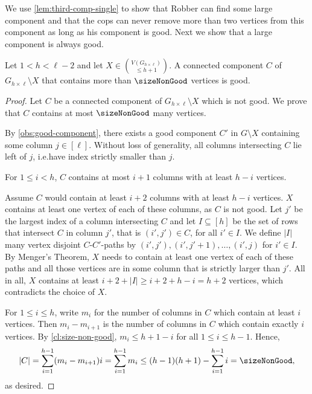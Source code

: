 \documentclass[a4paper,UKenglish,cleveref, autoref, thm-restate]{lipics-v2021}
\newcommand{\grid}[2]{\ensuremath{G_{#1 \times #2}}}
\begin{document}
We use \cref{lem:third-comp-single} to show that Robber can find some large component and that the cops can never remove more than two vertices from this component as long as his component is good.
Next we show that a large component is always good.

\begin{lemma}
	\label{lem:size-non-good}
	Let $1<h<\ell-2$ and let $X\in \binom{V(\grid{h}{\ell})}{\leq h+1}$. A connected component $C$ of $\grid{h}{\ell}\setminus X$
	that contains more than $\sizeNonGood$ vertices is good.
\end{lemma}

\begin{proof}
	Let $C$ be a connected component of $\grid{h}{\ell}\setminus X$ which is not good. We prove that $C$ contains at most $\sizeNonGood$ many vertices.
	
	By \cref{obs:good-component}, there exists a good component $C'$ in $G \setminus X$ containing some column $j \in [\ell]$. Without loss of generality, all columns intersecting $C$ lie left of $j$, i.e.\@ have index strictly smaller than $j$.
	
	\begin{claim} \label{cl:size-non-good}
		For $1\leq i<h$,
		$C$ contains at most $i+1$ columns with at least $h-i$ vertices.
	\end{claim}
	\begin{claimproof}
		Assume $C$ would contain at least $i+2$ columns with at least $h-i$ vertices.
		$X$ contains at least one vertex of each of these columns, as $C$ is not good.
		Let $j'$ be the largest index of a column intersecting $C$ and let $I \subseteq [h]$ be the set of rows that intersect $C$ in column $j'$, that is $(i',j')\in C$, for all $i'\in I$.
		We define $|I|$ many vertex disjoint $C$-$C'$-paths by $(i',j'),(i',j'+1),\ldots,(i',j)$ for $i' \in I$.
		By Menger's Theorem, $X$ needs to contain at least one vertex of each of these paths and all those vertices are in some column that is strictly larger than $j'$.
		All in all, $X$ contains at least $i+2+|I|\geq i+2+h-i=h+2$ vertices, which contradicts the choice of $X$.
	\end{claimproof}
	
	For $1 \leq i \leq h$, write $m_i$ for the number of columns in $C$ which contain at least $i$ vertices. Then $m_i - m_{i+1}$ is the number of columns in $C$ which contain exactly $i$ vertices. 
	By \cref{cl:size-non-good}, $m_i \leq h +1 - i$ for all $1 \leq i \leq h-1$.
	Hence,
	\[
		|C| = \sum_{i = 1}^{h-1} (m_i - m_{i+1}) i = \sum_{i=1}^{h-1} m_i \leq (h-1)(h+1) - \sum_{i=1}^{h-1} i = \sizeNonGood,
	\]
	as desired.
\end{proof}
\end{document}
